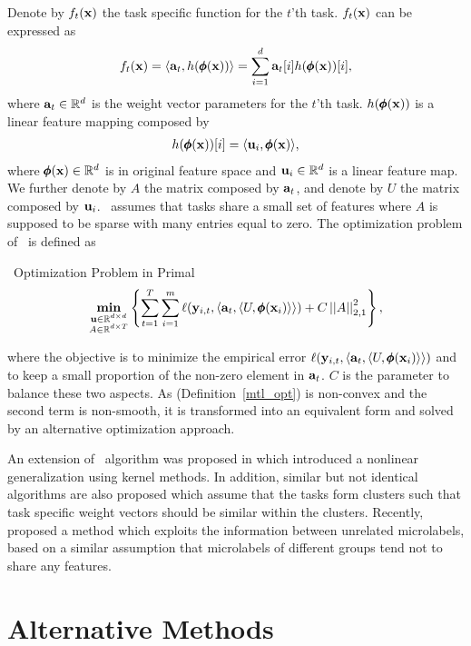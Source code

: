 {Denote by $f_t(\mathbf {x})$ the task specific function for the $t$'th task.
$f_t(\mathbf {x})$ can be expressed as
\begin{align*}
	f_t(\mathbf {x}) = \langle \mathbf {a}_t, h(\pmb \phi(\mathbf {x})) \rangle = \sum_{i=1}^{d}\mathbf {a}_{t}[i]h(\pmb \phi(\mathbf {x}))[i],
\end{align*}
where $\mathbf {a}_t\in\mathbb{R}^d$ is the weight vector parameters for the $t$'th task.
$h(\pmb \phi(\mathbf {x}))$ is a linear feature mapping composed by
\begin{align*}
	h(\pmb \phi(\mathbf {x}))[i] = \langle \mathbf {u}_i, \pmb \phi(\mathbf {x}) \rangle,
\end{align*}
where $\pmb \phi(\mathbf {x})\in\mathbb{R}^d$ is in original feature space and $\mathbf {u}_i\in\mathbb{R}^{d}$ is a linear feature map.
We further denote by $A$ the matrix composed by $\mathbf {a}_{t}$, and denote by $U$ the matrix composed by $\mathbf {u}_i$.
\mtl\ assumes that tasks share a small set of features where $A$ is supposed to be sparse with many entries equal to zero.
The optimization problem of \mtl\ is defined as
\begin{definition}{\mtl\ Optimization Problem in Primal}\label{mtl_opt}
	\begin{align*}
		\underset{\substack{\mathbf {u}\in\mathbb{R}^{d\times d}\\A\in\mathbb{R}^{d\times T}}}{\textbf{min}} \left\{\sum_{t=1}^{T}\sum_{i=1}^{m}\ell(\mathbf {y}_{i,t},\langle \mathbf {a}_t, \langle U, \pmb \phi(\mathbf {x}_i) \rangle \rangle)+C\left|\left| A \right|\right|_{2,1}^2\right\},
	\end{align*}
\end{definition}
where the objective is to minimize the empirical error $\ell(\mathbf {y}_{i,t},\langle \mathbf {a}_t, \langle U, \pmb \phi(\mathbf {x}_i) \rangle \rangle)$ and to keep a small proportion of the non-zero element in $\mathbf {a}_t$.
$C$ is the parameter to balance these two aspects.
As (Definition~\ref{mtl_opt}) is non-convex and the second term is non-smooth, it is transformed into an equivalent form and solved by an alternative optimization approach.

An extension of \mtl\ algorithm was proposed in \citep{Argyriou08convex} which introduced a nonlinear generalization using kernel methods.
In addition, similar but not identical algorithms \citep{Argyriou08an,Jacob09cluster} are also proposed which assume that the tasks form clusters such that task specific weight vectors should be similar within the clusters.
Recently, \citet{Paredes12exploit} proposed a method which exploits the information between unrelated microlabels, based on a similar assumption that microlabels of different groups tend not to share any features.

\section{Alternative Methods}


}
